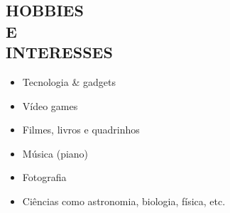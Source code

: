 \documentclass[margin]{res}
\begin{document}
\begin{resume}
		\section{HOBBIES \\ E \\ INTERESSES}
			\begin{itemize}
				\itemsep -2pt
		    	\item Tecnologia \& gadgets
				\item Vídeo games
				\item Filmes, livros e quadrinhos
				\item Música (piano)
				\item Fotografia
				\item Ciências como astronomia, biologia, física, etc.
			\end{itemize}
	\end{resume}
\end{document}
